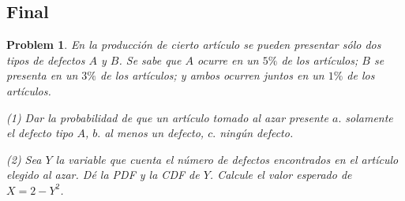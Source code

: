 \documentclass[a4paper, 12pt]{article}
\newtheorem{problem}{Problem}
\newtheorem{problem}{Problem}
\begin{document}
\pagebreak 

\subsection{Final}

\begin{problem}
    En la producción de cierto artículo se pueden presentar sólo dos tipos de
    defectos $A$ y $B$. Se sabe que $A$ ocurre en un $5\%$ de los artículos; $B$
    se presenta en un $3\%$ de los artículos; y ambos ocurren juntos en un $1\%$
    de los artículos.

    \textit{(1)} Dar la probabilidad de que un artículo tomado al azar presente
    $a.$ solamente el defecto tipo $A$, $b.$ al menos un defecto, $c.$ ningún
    defecto. 

    \textit{(2)} Sea $Y$ la variable que cuenta el número de defectos
    encontrados en el artículo elegido al azar. Dé la PDF y la CDF de $Y$.
    Calcule el valor esperado de $X = 2 - Y^2$.
\end{problem}
\end{document}
